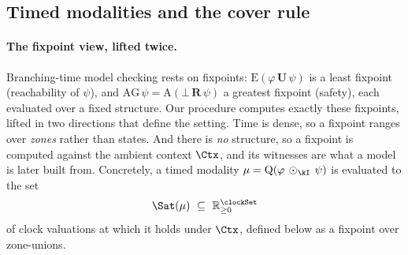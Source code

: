 
\subsection{Timed modalities and the cover rule}\label{sec:timed}

\paragraph{The fixpoint view, lifted twice.}
Branching-time model checking rests on fixpoints: $\mathrm{E}(\varphi\,\mathbf{U}\,\psi)$ is a least
fixpoint (reachability of $\psi$), and $\mathrm{AG}\,\psi=\mathrm{A}(\bot\,\mathbf{R}\,\psi)$ a greatest
fixpoint (safety), each evaluated over a fixed structure. Our procedure computes exactly these fixpoints,
lifted in two directions that define the setting. Time is dense, so a fixpoint ranges over \emph{zones}
rather than states. And there is \emph{no} structure, so a fixpoint is computed against the ambient context
$\Ctx$, and its witnesses are what a model is later built from. Concretely, a timed modality
$\mu=\mathrm{Q}(\varphi\,\odot_\kI\,\psi)$ is evaluated to the set
\[
\Sat(\mu)\ \subseteq\ \mathbb{R}_{\ge0}^{\clockSet}
\]
of clock valuations at which it holds under $\Ctx$, defined below as a fixpoint over zone-unions.

